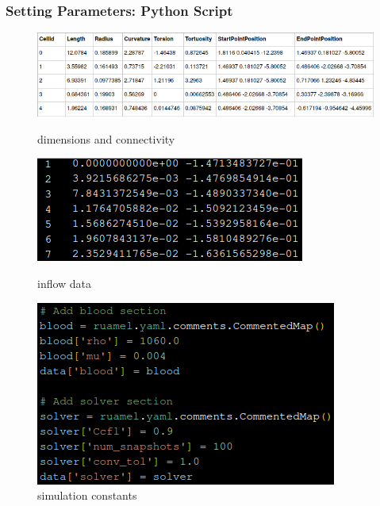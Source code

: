 \documentclass{beamer}
\begin{document}
\begin{frame}
	\frametitle{Setting Parameters: Python Script}
	\begin{minipage}{0.25\textwidth}
		\begin{figure}
			\includegraphics[width=\textwidth]{images/0053_extract4_cropped.png}
			\caption*{dimensions and connectivity}
			\includegraphics[width=\textwidth]{images/config0.png}
			\caption*{inflow data}
			\includegraphics[width=\textwidth]{images/config1.png}
			\caption*{simulation constants}
		\end{figure}
	\end{minipage}
	\begin{minipage}{0.1\textwidth}

\end{minipage}
\end{frame}
\end{document}
